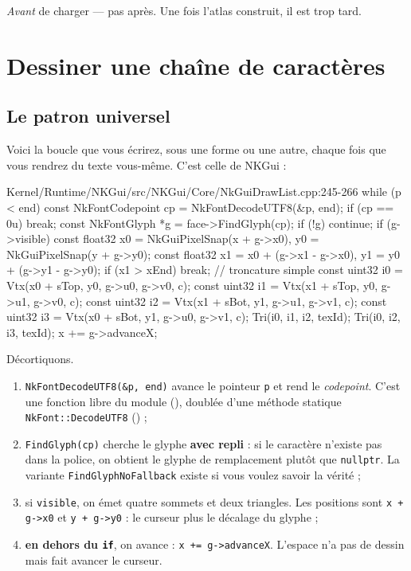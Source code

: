 \emph{Avant} de charger — pas après. Une fois l'atlas construit, il est trop
tard.

\section{Dessiner une chaîne de caractères}

\subsection{Le patron universel}

Voici la boucle que vous écrirez, sous une forme ou une autre, chaque fois que
vous rendrez du texte vous-même. C'est celle de NKGui :

\begin{nkcode}{Kernel/Runtime/NKGui/src/NKGui/Core/NkGuiDrawList.cpp:245-266}
            while (p < end) {
                const NkFontCodepoint cp = NkFontDecodeUTF8(&p, end);
                if (cp == 0u)
                    break;
                const NkFontGlyph *g = face->FindGlyph(cp);
                if (!g)
                    continue;
                if (g->visible) {
                    const float32 x0 = NkGuiPixelSnap(x + g->x0), y0 = NkGuiPixelSnap(y + g->y0);
                    const float32 x1 = x0 + (g->x1 - g->x0), y1 = y0 + (g->y1 - g->y0);
                    if (x1 > xEnd)
                        break; // troncature simple
                    const uint32 i0 = Vtx({x0 + sTop, y0}, {g->u0, g->v0}, c);
                    const uint32 i1 = Vtx({x1 + sTop, y0}, {g->u1, g->v0}, c);
                    const uint32 i2 = Vtx({x1 + sBot, y1}, {g->u1, g->v1}, c);
                    const uint32 i3 = Vtx({x0 + sBot, y1}, {g->u0, g->v1}, c);
                    Tri(i0, i1, i2, texId);
                    Tri(i0, i2, i3, texId);
                }
                x += g->advanceX;
            }
\end{nkcode}

Décortiquons.

\begin{enumerate}
  \item \texttt{NkFontDecodeUTF8(\&p, end)} avance le pointeur \texttt{p} et
        rend le \emph{codepoint}. C'est une fonction libre du module
        (), doublée d'une méthode statique
        \texttt{NkFont::DecodeUTF8} () ;
  \item \texttt{FindGlyph(cp)} cherche le glyphe \textbf{avec repli} : si le
        caractère n'existe pas dans la police, on obtient le glyphe de
        remplacement plutôt que \texttt{nullptr}. La variante
        \texttt{FindGlyphNoFallback} existe si vous voulez savoir la vérité ;
  \item si \texttt{visible}, on émet quatre sommets et deux triangles. Les
        positions sont \texttt{x + g->x0} et \texttt{y + g->y0} : le curseur plus
        le décalage du glyphe ;
  \item \textbf{en dehors du \texttt{if}}, on avance : \texttt{x += g->advanceX}.
        L'espace n'a pas de dessin mais fait avancer le curseur.
\end{enumerate}

